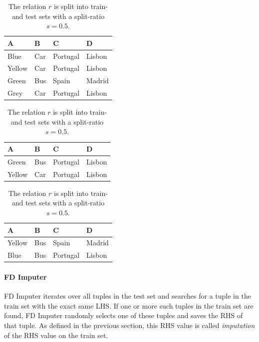\begin{table}[ht]
    \begin{subtable}[c]{0.9\textwidth}
        \centering
        \begin{tabular}{llll}
            \textsc{A} & \textsc{B} & \textsc{C} & \textsc{D} \\
        \toprule
        Blue & Car & Portugal & Lisbon \\
        Yellow & Car & Portugal & Lisbon  \\
        Green & Bus & Spain & Madrid  \\
        Grey & Car & Portugal & Lisbon  \\
        \bottomrule
        \end{tabular}
    \end{subtable}
    \begin{subtable}[c]{0.45\textwidth}
        \centering
        \begin{tabular}{llll}
            \textsc{A} & \textsc{B} & \textsc{C} & \textsc{D}  \\
        \toprule
            Green & Bus & Portugal & Lisbon \\
            Yellow & Car & Portugal & Lisbon \\
        \bottomrule
        \end{tabular}
    \end{subtable}
    \begin{subtable}[c]{0.45\textwidth}
        \centering
        \begin{tabular}{llll}
        \textsc{A} & \textsc{B} & \textsc{C} & \textsc{D} \\
        \toprule
        Yellow & Bus & Spain & Madrid \\
        Blue & Bus & Portugal & Lisbon \\
        \bottomrule
        \end{tabular}
    \end{subtable}
    \caption{The relation \( r \) is split into train- and test sets with a split-ratio \( s = 0.5 \). }
    \label{tab:split-example-fd-imputer}
\end{table}

\paragraph{FD Imputer} FD Imputer iterates over all tuples in the test set and searches for a tuple in the train set with the exact same LHS.
If one or more such tuples in the train set are found, FD Imputer randomly selects one of these tuples and saves the RHS of that tuple.
As defined in the previous section, this RHS value is called \emph{imputation} of the RHS value on the train set.

